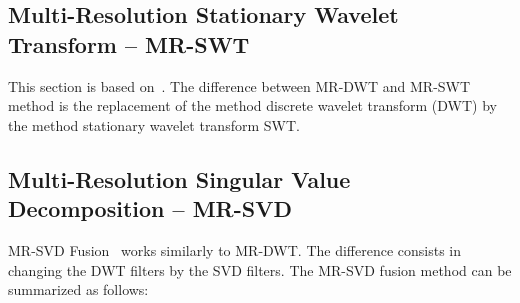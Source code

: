 \documentclass[journal]{IEEEtran}
\begin{document}
\subsection{Multi-Resolution Stationary Wavelet Transform -- MR-SWT}  
This section is based on~\cite{n_r, jjly}. The difference between MR-DWT and MR-SWT method is the replacement of the method discrete wavelet transform (DWT) by the method stationary wavelet transform SWT. 

\subsection{Multi-Resolution Singular Value Decomposition -- MR-SVD}

MR-SVD Fusion~\cite{naidu} works similarly to MR-DWT. 
The difference consists in changing the DWT filters by the SVD filters. 
The MR-SVD fusion method can be summarized as follows:
\end{document}
